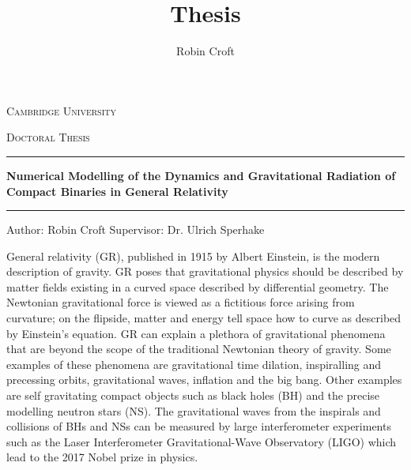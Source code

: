 \documentclass[11pt]{report}  %
\title{Thesis}
\author{Robin Croft}
\numberwithin{equation}{section}
\begin{document}
\begin{titlepage}
  \centering

  \centering
  {\scshape\LARGE Cambridge University \par}
  \vspace{1cm}
  {\scshape\Large Doctoral Thesis \par}
    \vspace{2cm}
    \hrule
    \vspace{0.3cm}
  {\Large\itshape \par}
  {\huge\bfseries Numerical Modelling of the Dynamics and Gravitational Radiation of Compact Binaries in General Relativity\par} \vspace{0.3cm}
  \hrule
  \vfill
   Author: Robin Croft
\vfill
  Supervisor: Dr. Ulrich Sperhake
  \vfill

    \begin{figure}[h!]
  \centering
\end{figure}


\end{titlepage}						%


\abstract
\vspace{2cm}
General relativity (GR), published in 1915 by Albert Einstein, is the modern description of gravity. GR poses that gravitational physics should be described by matter fields existing in a curved space described by differential geometry. The Newtonian gravitational force is viewed as a fictitious force arising from curvature; on the flipside, matter and energy tell space how to curve as described by Einstein's equation. GR can explain a plethora of gravitational phenomena that are beyond the scope of the traditional Newtonian theory of gravity. Some examples of these phenomena are gravitational time dilation, inspiralling and precessing orbits, gravitational waves, inflation and the big bang. Other examples are self gravitating compact objects such as black holes (BH) and the precise modelling neutron stars (NS). The gravitational waves from the inspirals and collisions of BHs and NSs can be measured by large interferometer experiments such as the Laser Interferometer Gravitational-Wave Observatory (LIGO) which lead to the 2017 Nobel prize in physics.
\end{document}

